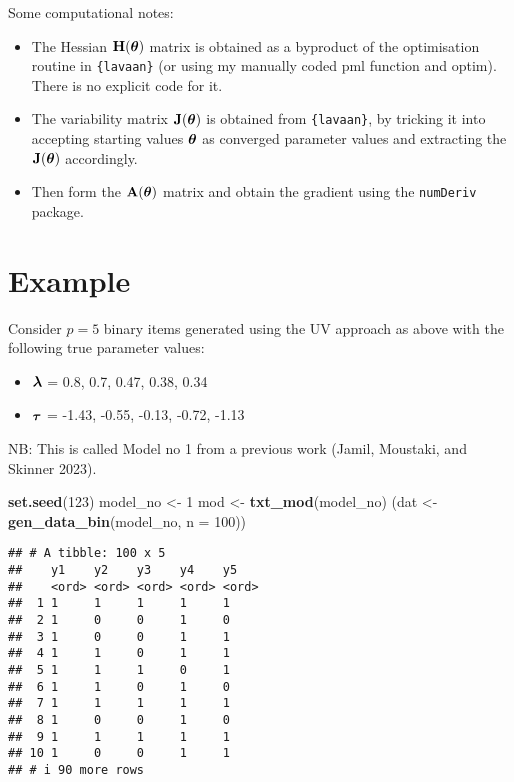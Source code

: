 \documentclass[
]{article}
\newenvironment{Shaded}{\begin{snugshade}}{\end{snugshade}}
\newcommand{\AttributeTok}[1]{\textcolor[rgb]{0.13,0.29,0.53}{#1}}
\newcommand{\DecValTok}[1]{\textcolor[rgb]{0.00,0.00,0.81}{#1}}
\newcommand{\FunctionTok}[1]{\textcolor[rgb]{0.13,0.29,0.53}{\textbf{#1}}}
\newcommand{\NormalTok}[1]{#1}
\newcommand{\OtherTok}[1]{\textcolor[rgb]{0.56,0.35,0.01}{#1}}
\providecommand{\tightlist}{%
  \setlength{\itemsep}{0pt}\setlength{\parskip}{0pt}}
\begin{document}
Some computational notes:

\begin{itemize}
\tightlist
\item
  The Hessian \({\mathbf H}({\boldsymbol\theta})\) matrix is obtained as a byproduct of the
  optimisation routine in \texttt{\{lavaan\}} (or using my manually
  coded pml function and optim). There is no explicit code for it.
\item
  The variability matrix \({\mathbf J}({\boldsymbol\theta})\) is obtained from
  \texttt{\{lavaan\}}, by tricking it into accepting starting values
  \({\boldsymbol\theta}\) as converged parameter values and extracting the
  \({\mathbf J}({\boldsymbol\theta})\) accordingly.
\item
  Then form the \({\mathbf A}({\boldsymbol\theta})\) matrix and obtain the gradient using
  the \texttt{numDeriv} package.
\end{itemize}

\section{Example}\label{example}

Consider \(p=5\) binary items generated using the UV approach as above
with the following true parameter values:

\begin{itemize}
\tightlist
\item
  \({\boldsymbol\lambda}\) = 0.8, 0.7, 0.47, 0.38, 0.34
\item
  \({\boldsymbol\tau}\) = -1.43, -0.55, -0.13, -0.72, -1.13
\end{itemize}

NB: This is called Model no 1 from a previous work (Jamil, Moustaki, and
Skinner 2023).

\begin{Shaded}
\begin{Highlighting}[]
\FunctionTok{set.seed}\NormalTok{(}\DecValTok{123}\NormalTok{)}
\NormalTok{model\_no }\OtherTok{\textless{}{-}} \DecValTok{1}
\NormalTok{mod }\OtherTok{\textless{}{-}} \FunctionTok{txt\_mod}\NormalTok{(model\_no)}
\NormalTok{(dat }\OtherTok{\textless{}{-}} \FunctionTok{gen\_data\_bin}\NormalTok{(model\_no, }\AttributeTok{n =} \DecValTok{100}\NormalTok{))}
\end{Highlighting}
\end{Shaded}

\begin{verbatim}
## # A tibble: 100 x 5
##    y1    y2    y3    y4    y5   
##    <ord> <ord> <ord> <ord> <ord>
##  1 1     1     1     1     1    
##  2 1     0     0     1     0    
##  3 1     0     0     1     1    
##  4 1     1     0     1     1    
##  5 1     1     1     0     1    
##  6 1     1     0     1     0    
##  7 1     1     1     1     1    
##  8 1     0     0     1     0    
##  9 1     1     1     1     1    
## 10 1     0     0     1     1    
## # i 90 more rows
\end{verbatim}
\end{document}
